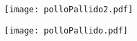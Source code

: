\documentclass[italian]{book}
\begin{document}
\maketitle

\texttt{[image: polloPallido2.pdf]}

\texttt{[image: polloPallido.pdf]}
\end{document}
